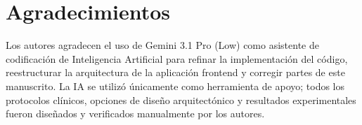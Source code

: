 \documentclass[12pt,a4paper]{article}
\begin{document}
\newpage

\section{Agradecimientos}

Los autores agradecen el uso de Gemini 3.1 Pro (Low) como asistente de codificación de Inteligencia Artificial para refinar la implementación del código, reestructurar la arquitectura de la aplicación frontend y corregir partes de este manuscrito. La IA se utilizó únicamente como herramienta de apoyo; todos los protocolos clínicos, opciones de diseño arquitectónico y resultados experimentales fueron diseñados y verificados manualmente por los autores.

\newpage


\end{document}
